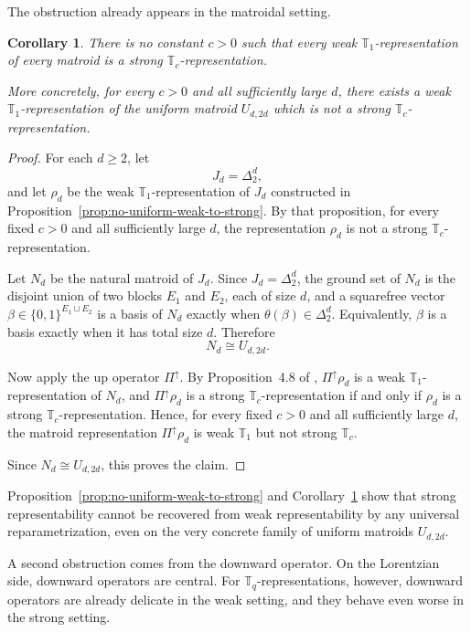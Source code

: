 \documentclass[12pt]{amsart}
\newtheorem{corollary}[theorem]{Corollary}
\theoremstyle{definition}
\newcommand{\1}{\mathbf{1}}
\newcommand\T{{\mathbb T}}
\begin{document}
The obstruction already appears in the matroidal setting.

\begin{corollary}
\label{cor:no-uniform-weak-to-strong-matroid}
There is no constant $c>0$ such that every weak $\T_1$-representation of every matroid
is a strong $\T_c$-representation.

More concretely, for every $c>0$ and all sufficiently large $d$, there exists a weak
$\T_1$-representation of the uniform matroid $U_{d,2d}$ which is not a strong
$\T_c$-representation.
\end{corollary}

\begin{proof}
For each $d\ge 2$, let
\[
J_d=\Delta_2^d,
\]
and let $\rho_d$ be the weak $\T_1$-representation of $J_d$ constructed in
Proposition~\ref{prop:no-uniform-weak-to-strong}. By that proposition, for every fixed
$c>0$ and all sufficiently large $d$, the representation $\rho_d$ is not a strong
$\T_c$-representation.

Let $N_d$ be the natural matroid of $J_d$. Since $J_d=\Delta_2^d$, the ground set of
$N_d$ is the disjoint union of two blocks $E_1$ and $E_2$, each of size $d$, and a
squarefree vector $\beta\in \{0,1\}^{E_1\sqcup E_2}$ is a basis of $N_d$ exactly when
$\theta(\beta)\in \Delta_2^d$. Equivalently, $\beta$ is a basis exactly when it has total
size $d$. Therefore
\[
N_d \cong U_{d,2d}.
\]

Now apply the up operator $\Pi^\uparrow$. By Proposition~4.8 of \cite{BHKL0},
$\Pi^\uparrow\rho_d$ is a weak $\T_1$-representation of $N_d$, and
$\Pi^\uparrow\rho_d$ is a strong $\T_c$-representation if and only if $\rho_d$ is a
strong $\T_c$-representation. Hence, for every fixed $c>0$ and all sufficiently large
$d$, the matroid representation $\Pi^\uparrow\rho_d$ is weak $\T_1$ but not strong
$\T_c$.

Since $N_d\cong U_{d,2d}$, this proves the claim.
\end{proof}

Proposition~\ref{prop:no-uniform-weak-to-strong} and
Corollary~\ref{cor:no-uniform-weak-to-strong-matroid} show that strong representability
cannot be recovered from weak representability by any universal reparametrization, even on
the very concrete family of uniform matroids $U_{d,2d}$.

A second obstruction comes from the downward operator. On the Lorentzian side, downward
operators are central. For $\T_q$-representations, however, downward operators are already delicate in the
weak setting, and they behave even worse in the strong setting.
\end{document}
